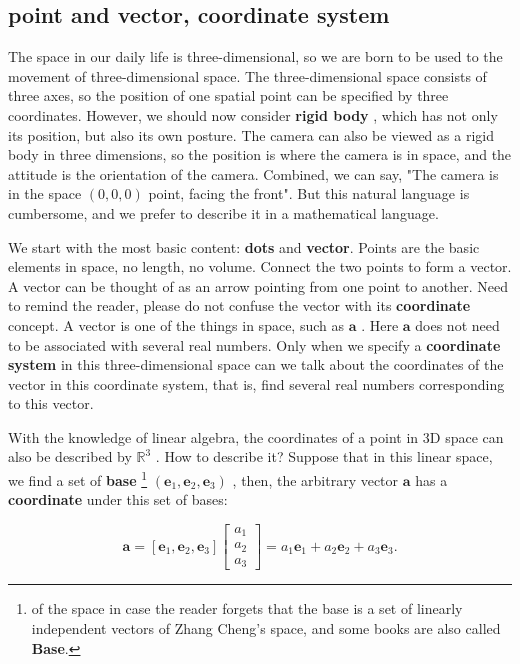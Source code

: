 \subsection{point and vector, coordinate system}

The space in our daily life is three-dimensional, so we are born to be used to the movement of three-dimensional space. The three-dimensional space consists of three axes, so the position of one spatial point can be specified by three coordinates. However, we should now consider \textbf{rigid body} , which has not only its position, but also its own posture. The camera can also be viewed as a rigid body in three dimensions, so the position is where the camera is in space, and the attitude is the orientation of the camera. Combined, we can say, "The camera is in the space $ ( 0 , 0 , 0 ) $ point, facing the front". But this natural language is cumbersome, and we prefer to describe it in a mathematical language.

We start with the most basic content: \textbf{dots} and \textbf{vector}. Points are the basic elements in space, no length, no volume. Connect the two points to form a vector. A vector can be thought of as an arrow pointing from one point to another. Need to remind the reader, please do not confuse the vector with its \textbf{coordinate} concept. A vector is one of the things in space, such as $ \bm{a} $ . Here $ \bm{a} $ does not need to be associated with several real numbers. Only when we specify a \textbf{coordinate system} in this three-dimensional space can we talk about the coordinates of the vector in this coordinate system, that is, find several real numbers corresponding to this vector.

With the knowledge of linear algebra, the coordinates of a point in 3D space can also be described by $ \mathbb{R}^3 $ . How to describe it? Suppose that in this linear space, we find a set of \textbf{base} \footnote{ of the space in case the reader forgets that the base is a set of linearly independent vectors of Zhang Cheng's space, and some books are also called \textbf{Base}. } $ (\bm{e}_1,\bm{e}_2,\bm{e}_3) $ , then, the arbitrary vector $ \bm{a} $ has a \textbf{coordinate} under this set of bases:

\begin{equation}
\bm{a} = \left[ {{\bm{e}_1},{\bm{e}_2},{\bm{e}_3}} \right]\left[ \begin{array}{l}
{a_1}\\
{a_2}\\
{a_3}
\end{array} \right] = {a_1}{\bm{e}_1} + {a_2}{\bm{e}_2} + {a_3}{\bm{e}_3}.
\end{equation}

